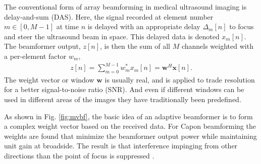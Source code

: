\documentclass[12pt,journal,onecolumn]{IEEEtran}
\newcommand{\mat}[1]{\mathbf{#1}}
\renewcommand{\vec}[1]{\mathbf{#1}}
\begin{document}



The conventional form of array beamforming in medical ultrasound imaging is delay-and-sum (DAS). Here, the signal recorded at element number $m \in [0,M-1]$ at time $n$ is delayed with an appropriate delay $\Delta_m[n]$ to focus and steer the ultrasound beam in space. This delayed data is denoted $x_m[n]$. The beamformer output, $z[n]$, is then the sum of all $M$ channels weighted with a per-element factor $w_m$,
\begin{align}
z[n] = \sum_{m = 0}^{M-1}w_m^*x_m[n] = \vec{w}^H\vec{x}[n]. \label{eq:z}
\end{align}
The weight vector or window $\vec{w}$ is usually real, and is applied to trade resolution for a better signal-to-noise ratio (SNR). And even if different windows can be used in different areas of the images they have traditionally been predefined.

As shown in Fig. \ref{fig:mvbf}, the basic idea of an adaptive beamformer is to form a complex weight vector based on the received data. For Capon beamforming the weights are found that minimize the beamformer output power while maintaining unit gain at broadside. The result is that interference impinging from other directions than the point of focus is suppressed \cite{Synnevag2007}.

\end{document}
